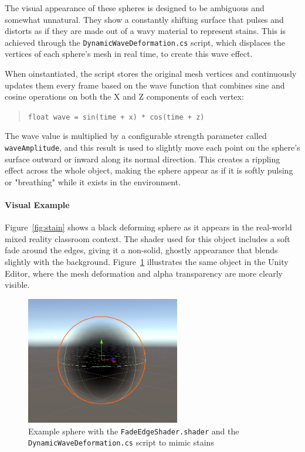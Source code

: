 \vspace{1em}

The visual appearance of these spheres is designed to be ambiguous and somewhat unnatural. They show a constantly shifting surface that pulses and distorts as if they are made out of a wavy material to represent stains. This is achieved through the \texttt{DynamicWaveDeformation.cs} script, which displaces the vertices of each sphere's mesh in real time, to create this wave effect.

When oinstantiated, the script stores the original mesh vertices and continuously updates them every frame based on the wave function that combines sine and cosine operations on both the X and Z components of each vertex:

\begin{quote}
\texttt{float wave = sin(time + x) * cos(time + z)}
\end{quote}

The wave value is multiplied by a configurable strength parameter called \texttt{waveAmplitude}, and this result is used to slightly move each point on the sphere’s surface outward or inward along its normal direction. This creates a rippling effect across the whole object, making the sphere appear as if it is softly pulsing or "breathing" while it exists in the environment.


\paragraph{Visual Example}
Figure~\ref{fig:stain} shows a black deforming sphere as it appears in the real-world mixed reality classroom context. The shader used for this object includes a soft fade around the edges, giving it a non-solid, ghostly appearance that blends slightly with the background. Figure~\ref{fig:fadeedgeshader} illustrates the same object in the Unity Editor, where the mesh deformation and alpha transparency are more clearly visible.


\begin{figure}[h!] 
    \centering 
    \includegraphics[width=0.6\textwidth]{../../Figures/fadeedgeshader.jpg} 
    \caption{Example sphere with the \texttt{FadeEdgeShader.shader} and the \texttt{DynamicWaveDeformation.cs} script to mimic stains} 
    \label{fig:fadeedgeshader} 
\end{figure}

